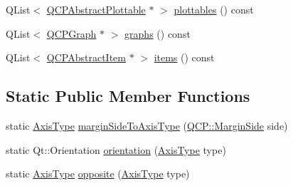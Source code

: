 \begin{DoxyCompactItemize}
\item 
Q\+List$<$ \hyperlink{classQCPAbstractPlottable}{Q\+C\+P\+Abstract\+Plottable} $\ast$ $>$ \hyperlink{classQCPAxis_a4f7404494cccdbfc00e1e865b7ed16a4}{plottables} () const 
\item 
Q\+List$<$ \hyperlink{classQCPGraph}{Q\+C\+P\+Graph} $\ast$ $>$ \hyperlink{classQCPAxis_ad3919e7d7400f55446ea82018fe5e3a8}{graphs} () const 
\item 
Q\+List$<$ \hyperlink{classQCPAbstractItem}{Q\+C\+P\+Abstract\+Item} $\ast$ $>$ \hyperlink{classQCPAxis_ae437656a5fd1a03721a8f2d7aab460fe}{items} () const 
\end{DoxyCompactItemize}
\subsection*{Static Public Member Functions}
\begin{DoxyCompactItemize}
\item 
static \hyperlink{classQCPAxis_ae2bcc1728b382f10f064612b368bc18a}{Axis\+Type} \hyperlink{classQCPAxis_ac0a6b77bd52bec6c81cd62d167cfeba6}{margin\+Side\+To\+Axis\+Type} (\hyperlink{namespaceQCP_a7e487e3e2ccb62ab7771065bab7cae54}{Q\+C\+P\+::\+Margin\+Side} side)
\item 
static Qt\+::\+Orientation \hyperlink{classQCPAxis_a9a68b3e45f1b1e33d4d807822342516c}{orientation} (\hyperlink{classQCPAxis_ae2bcc1728b382f10f064612b368bc18a}{Axis\+Type} type)
\item 
static \hyperlink{classQCPAxis_ae2bcc1728b382f10f064612b368bc18a}{Axis\+Type} \hyperlink{classQCPAxis_aa85ba73dfee6483e23825461b725e363}{opposite} (\hyperlink{classQCPAxis_ae2bcc1728b382f10f064612b368bc18a}{Axis\+Type} type)
\end{DoxyCompactItemize}
